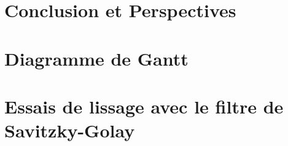 \documentclass[a4paper,12pt,oneside,chapterprefix=true]{scrbook}
\begin{document}
  
  
  \chapter{Conclusion et Perspectives}
  
  
  
\appendix

\chapter{Diagramme de Gantt}\label{annexe-a}
\chapter{Essais de lissage avec le filtre de Savitzky-Golay}\label{annexe-b}

\backmatter

\printglossary[type=\acronymtype]

\cleardoublepage
{}


  
\end{document}
